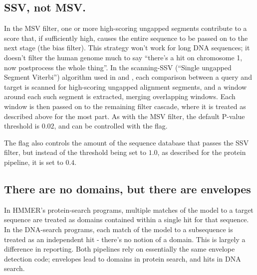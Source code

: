 \subsection{SSV, not MSV.}

In the MSV filter, one or more high-scoring ungapped segments
contribute to a score that, if sufficiently high, causes the entire
sequence to be passed on to the next stage (the bias filter). This
strategy won't work for long DNA sequences; it doesn't filter the
human genome much to say ``there's a hit on chromosome 1, now
postprocess the whole thing''. In the scanning-SSV (``Single ungapped
Segment Viterbi'') algorithm used in  and
, each comparison between a query and target is scanned
for high-scoring ungapped alignment segments, and a window around each
such segment is extracted, merging overlapping windows. Each window is
then passed on to the remaining filter cascade, where it is treated as
described above for the most part. As with the MSV filter, the default
P-value threshold is $0.02$, and can be controlled with the
 flag.

The  flag also controls the amount of the sequence database that
passes the SSV filter, but instead of the threshold being set to $1.0$, as
described for the protein pipeline, it is set to $0.4$.



\subsection{There are no domains, but there are envelopes}

In HMMER's protein-search programs, multiple matches of the model to a
target sequence are treated as domains contained within a single hit
for that sequence. In the DNA-search programs, each match of the model
to a subsequence is treated as an independent hit - there's no notion
of a domain. This is largely a difference in reporting. Both pipelines
rely on essentially the same envelope detection code; envelopes lead
to domains in protein search, and hits in DNA search.


